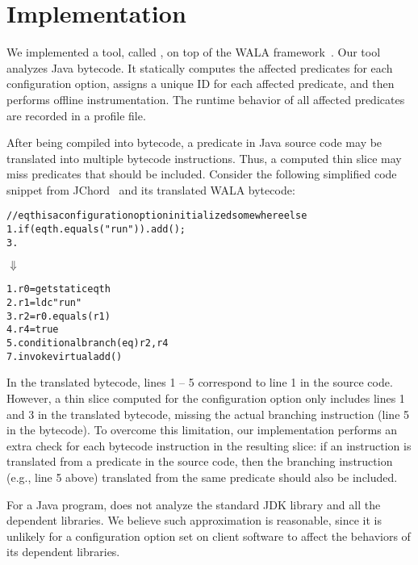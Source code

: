 \section{Implementation}
\label{sec:implementation}

We implemented a tool, called \ourtool, on top of the WALA
framework~\cite{wala}. Our tool analyzes Java bytecode.
It statically computes the affected predicates
for each configuration option, assigns a unique
ID for each affected predicate, and then performs offline instrumentation.
The runtime behavior of all affected predicates are recorded
in a profile file. 


After being compiled into bytecode,
a predicate in Java source code may be translated into multiple bytecode
instructions. Thus, a computed thin slice may
miss predicates that should be included.
Consider the following simplified code snippet from JChord~\cite{chordtutorial}
and its translated WALA bytecode:


\begin{CodeOut}
\begin{alltt}
   // eqth is a configuration option initialized somewhere else
1. if (eqth.equals("run")) .   add();
3. \ttrcb
\end{alltt}
\end{CodeOut}
\vspace{-2mm}
\hspace{20mm}$\Downarrow$ 
\begin{CodeOut}
\begin{alltt}
1. r0 = getstatic eqth
2. r1 = ldc "run"
3. r2 = r0.equals(r1)
4. r4 = true
5. conditional branch(eq) r2, r4
7. invokevirtual add() 
\end{alltt}
\end{CodeOut}

In the translated bytecode, lines 1 -- 5 correspond to line 1 in the
source code. However, a thin slice computed
for the configuration option  only includes lines 1 and 3
in the translated bytecode, missing the actual branching
instruction (line 5 in the bytecode).
To overcome this limitation, our implementation performs an extra check
for each bytecode instruction in the resulting slice:
if an instruction 
is translated from a predicate in the source code, then the
branching instruction (e.g., line 5 above) translated
from the same predicate should also be included.


For a Java program, \ourtool does not analyze the standard JDK
library and all the dependent libraries. We believe such approximation
is reasonable, since it is
unlikely for a configuration option set on client software
to affect the behaviors of its dependent libraries.

